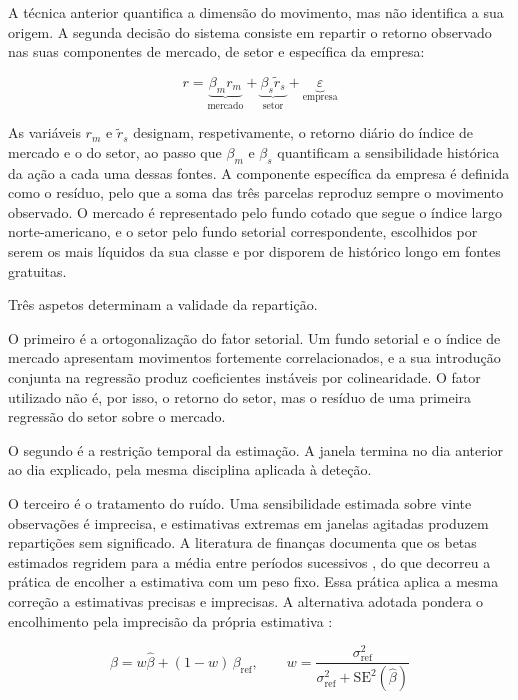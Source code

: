 A técnica anterior quantifica a dimensão do movimento, mas não identifica a sua origem. A segunda
decisão do sistema consiste em repartir o retorno observado nas suas componentes de mercado, de
setor e específica da empresa:

\begin{equation}
r = \underbrace{\beta_m r_m}_{\text{mercado}} + \underbrace{\beta_s \tilde{r}_s}_{\text{setor}} + \underbrace{\varepsilon}_{\text{empresa}}
\label{eq:decomposicao}
\end{equation}

As variáveis $r_m$ e $\tilde{r}_s$ designam, respetivamente, o retorno diário do índice de mercado
e o do setor, ao passo que $\beta_m$ e $\beta_s$ quantificam a sensibilidade histórica da ação a
cada uma dessas fontes. A componente específica da empresa é
definida como o resíduo, pelo que a soma das três parcelas reproduz sempre o movimento observado.
O mercado é representado pelo fundo cotado que segue o índice largo norte-americano, e o setor
pelo fundo setorial correspondente, escolhidos por serem os mais líquidos da sua classe e por
disporem de histórico longo em fontes gratuitas.

Três aspetos determinam a validade da repartição.

O primeiro é a ortogonalização do fator setorial. Um fundo setorial e o índice de mercado
apresentam movimentos fortemente correlacionados, e a sua introdução conjunta na regressão produz
coeficientes instáveis por colinearidade. O fator utilizado não é, por isso, o retorno do setor,
mas o resíduo de uma primeira regressão do setor sobre o mercado.

O segundo é a restrição temporal da estimação. A janela termina no dia anterior ao dia explicado,
pela mesma disciplina aplicada à deteção.

O terceiro é o tratamento do ruído. Uma sensibilidade estimada sobre vinte observações é imprecisa,
e estimativas extremas em janelas agitadas produzem repartições sem significado. A literatura de
finanças documenta que os betas estimados regridem para a média entre períodos sucessivos
\autocite{blume1971risk}, do que decorreu a prática de encolher a estimativa com um peso fixo. Essa
prática aplica a mesma correção a estimativas precisas e imprecisas. A alternativa adotada pondera
o encolhimento pela imprecisão da própria estimativa \autocite{vasicek1973beta}:

\begin{equation}
\beta = w \hat{\beta} + (1-w)\,\beta_{\text{ref}}, \qquad w = \frac{\sigma^2_{\text{ref}}}{\sigma^2_{\text{ref}} + \mathrm{SE}^2(\hat{\beta})}
\label{eq:vasicek}
\end{equation}

